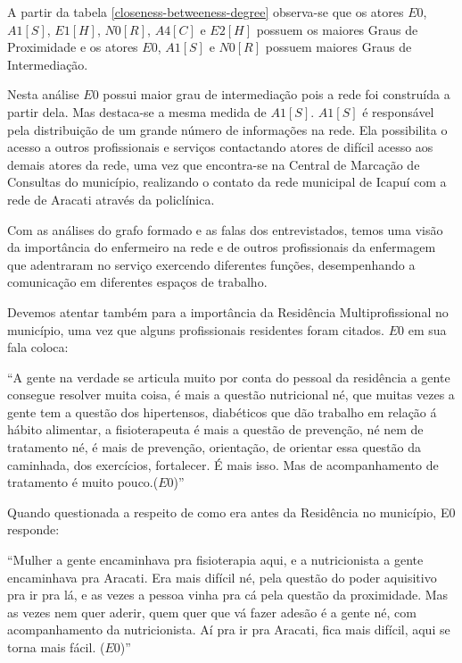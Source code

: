 A partir da tabela \ref{closeness-betweeness-degree} observa-se que os atores $E0$, $A1 [S]$, $E1 [H]$, $N0 [R]$, $A4 [C]$ e $E2 [H]$ possuem os maiores Graus de Proximidade e os atores $E0$, $A1 [S]$ e $N0 [R]$ possuem maiores Graus de Intermediação.

Nesta análise $E0$ possui maior grau de intermediação pois a rede foi construída a partir dela. Mas destaca-se a mesma medida de $A1[S]$. $A1[S]$ é responsável pela distribuição de um grande número de informações na rede. Ela possibilita o acesso a outros profissionais e serviços contactando atores de difícil acesso aos demais atores da rede, uma vez que encontra-se na Central de Marcação de Consultas do município, realizando o contato da rede municipal de Icapuí com a rede de Aracati através da policlínica.

Com as análises do grafo formado e as falas dos entrevistados, temos uma visão da importância do enfermeiro na rede e de outros profissionais da enfermagem que adentraram no serviço exercendo diferentes funções, desempenhando a comunicação  em diferentes espaços de trabalho.

Devemos atentar também para a importância da Residência Multiprofissional no município, uma vez que alguns profissionais residentes foram citados. $E0$ em sua fala coloca:

\begin{citacao}
``A gente na verdade se articula muito por conta do pessoal da residência a gente consegue resolver muita coisa, é mais a questão nutricional né, que muitas vezes a gente tem a questão dos hipertensos, diabéticos que dão trabalho em relação á hábito alimentar, a fisioterapeuta é mais a questão de prevenção, né nem de tratamento né, é mais de prevenção, orientação, de orientar essa questão da caminhada, dos exercícios, fortalecer. É mais isso. Mas de acompanhamento de tratamento é muito pouco.($E0$)''
\end{citacao}

Quando questionada a respeito de como era antes da Residência no município, E0 responde:

\begin{citacao}
``Mulher a gente encaminhava pra fisioterapia aqui, e a nutricionista a gente encaminhava pra Aracati. Era mais difícil né, pela questão do poder aquisitivo pra ir pra lá, e as vezes a pessoa vinha pra cá pela questão da proximidade. Mas as vezes nem quer aderir, quem quer que vá fazer adesão é a gente né, com acompanhamento da nutricionista. Aí pra ir pra Aracati, fica mais difícil, aqui se torna mais fácil. ($E0$)''
\end{citacao}

